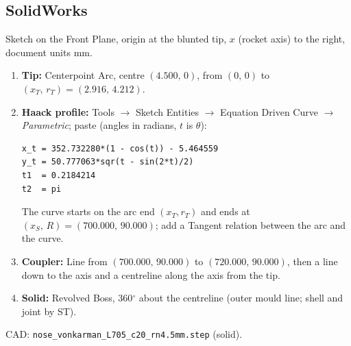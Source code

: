 \documentclass[10pt,a4paper]{article}
\begin{document}
\subsection*{SolidWorks}
Sketch on the Front Plane, origin at the blunted tip, $x$ (rocket axis) to the right, document units mm.
\begin{enumerate}\setlength{\itemsep}{1pt}
\item \textbf{Tip:} Centerpoint Arc, centre $(4.500,\,0)$, from $(0,\,0)$ to $(x_T,\,r_T) = (2.916,\,4.212)$.
\item \textbf{Haack profile:} Tools $\rightarrow$ Sketch Entities $\rightarrow$ Equation Driven Curve $\rightarrow$
  \emph{Parametric}; paste (angles in radians, $t$ is $\theta$):
\begin{Verbatim}[frame=single,fontsize=\small,xleftmargin=0pt]
x_t = 352.732280*(1 - cos(t)) - 5.464559
y_t = 50.777063*sqr(t - sin(2*t)/2)
t1  = 0.2184214
t2  = pi
\end{Verbatim}
  The curve starts on the arc end $(x_T, r_T)$ and ends at $(x_S,\,R) = (700.000,\,90.000)$;
  add a Tangent relation between the arc and the curve.
\item \textbf{Coupler:} Line from $(700.000,\,90.000)$ to $(720.000,\,90.000)$,
  then a line down to the axis and a centreline along the axis from the tip.
\item \textbf{Solid:} Revolved Boss, 360$^\circ$ about the centreline (outer mould line; shell and joint by ST).
\end{enumerate}
CAD: \texttt{nose\_vonkarman\_L705\_c20\_rn4.5mm.step} (solid).
\end{document}
